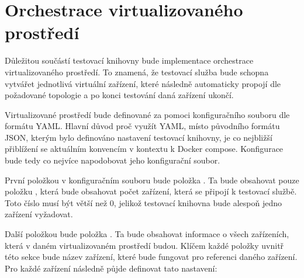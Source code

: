 \section{Orchestrace virtualizovaného prostředí}

Důležitou součástí testovací knihovny bude implementace orchestrace virtualizovaného prostředí. To znamená, že testovací služba bude schopna vytvářet jednotlivá virtuální zařízení, které následně automaticky propojí dle požadované topologie a po konci testování daná zařízení ukončí. 

Virtualizované prostředí bude definované za pomoci konfiguračního souboru dle formátu YAML. Hlavní důvod proč využít YAML, místo původního formátu JSON, kterým bylo definováno nastavení testovací knihovny, je co nejbližší přiblížení se aktuálním konvencím v kontextu k Docker compose. Konfigurace bude tedy co nejvíce napodobovat jeho konfigurační soubor. 

První položkou v konfiguračním souboru bude položka . Ta bude obsahovat pouze položku , která bude obsahovat počet zařízení, která se připojí k testovací službě. Toto číslo musí být větší než 0, jelikož testovací knihovna bude alespoň jedno zařízení vyžadovat.

Další položkou bude položka . Ta bude obsahovat informace o všech zařízeních, která v daném virtualizovaném prostředí budou. Klíčem každé položky uvnitř této sekce bude název zařízení, které bude fungovat pro referenci daného zařízení. Pro každé zařízení následně půjde definovat tato nastavení: 

